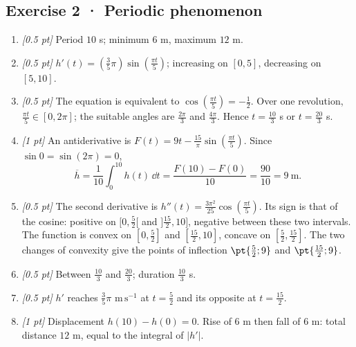 \subsection*{Exercise 2 · Periodic phenomenon}\begin{enumerate}

\item \textit{[0.5 pt]} Period $10$ s; minimum $6$ m, maximum $12$ m.

\item \textit{[0.5 pt]} $h'(t)=(\frac{3}{5}\pi)\sin (\frac{\pi t}{5})$; increasing on $[0,5]$, decreasing on $[5,10]$.

\item \textit{[0.5 pt]} The equation is equivalent to $\cos (\frac{\pi t}{5})=-\frac{1}{2}$. Over one revolution, $\frac{\pi t}{5}\in[0,2\pi]$; the suitable angles are $\frac{2\pi}{3}$ and $\frac{4\pi}{3}$. Hence $t=\frac{10}{3}$ s or $t=\frac{20}{3}$ s.

\item \textit{[1 pt]} An antiderivative is $F(t)=9t-\frac{15}{\pi}\sin (\frac{\pi t}{5})$. Since $\sin0=\sin(2\pi)=0$,
\[\overline h=\frac{1}{10}\int_0^{10}h(t)\,\dd t=\frac{F(10)-F(0)}{10}=\frac{90}{10}=9\ \mathrm{m}.\]

\item \textit{[0.5 pt]} The second derivative is $h''(t)=\frac{3\pi^2}{25}\cos (\frac{\pi t}{5})$. Its sign is that of the cosine: positive on $[0,\frac{5}{2}[$ and $]\frac{15}{2},10]$, negative between these two intervals. The function is convex on $[0,\frac{5}{2}]$ and $[\frac{15}{2},10]$, concave on $[\frac{5}{2},\frac{15}{2}]$. The two changes of convexity give the points of inflection $\pt{\frac{5}{2};9}$ and $\pt{\frac{15}{2};9}$.

\item \textit{[0.5 pt]} Between $\frac{10}{3}$ and $\frac{20}{3}$; duration $\frac{10}{3}$ s.

\item \textit{[0.5 pt]} $h'$ reaches $\frac{3}{5}\pi$ $\mathrm{m\,s^{-1}}$ at $t=\frac{5}{2}$ and its opposite at $t=\frac{15}{2}$.

\item \textit{[1 pt]} Displacement $h(10)-h(0)=0$. Rise of $6$ m then fall of $6$ m: total distance $12$ m, equal to the integral of $|h'|$.

\end{enumerate}


